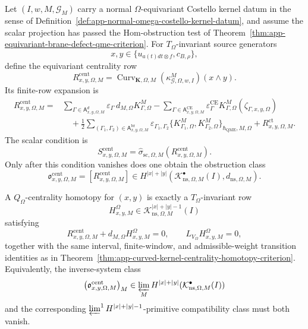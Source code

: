 \begin{prop}
\label{prop:app-qomega-centrality-homotopy-criterion}
  Let
  \((I,w,M,\mathcal G_M)\) carry a normal \(\Omega\)-equivariant
  Costello kernel datum in the sense of
  Definition~\ref{def:app-normal-omega-costello-kernel-datum}, and assume
  the scalar projection has passed the Hom-obstruction test of
  Theorem~\ref{thm:app-equivariant-brane-defect-qme-criterion}.  For
  \(T_\Omega\)-invariant source generators
  \[
    x,y\in\{u_{a(t)dt\otimes f},c_{B,\rho}\},
  \]
  define the equivariant centrality row
  \[
    R^{\mathrm{cent}}_{x,y,\Omega,M}
      =
    \operatorname{Curv}_{\mathbf K,\Omega,M}
      (\kappa^M_{\mathcal G,\Omega,w,I})(x\wedge y).
  \]
  Its finite-row expansion is
  \[
  \begin{aligned}
    R^{\mathrm{cent}}_{x,y,\Omega,M}
      ={}&
      \sum_{\Gamma\in\mathsf A_{x,y,\Omega,M}^{d}}
        \varepsilon_\Gamma\,d_{M,\Omega}K^M_{\Gamma,\Omega}
      -\sum_{\Gamma\in\mathsf A_{x,y,\Omega,M}^{\mathrm{CE}}}
        \varepsilon^{\mathrm{CE}}_\Gamma
        K^M_{\Gamma,\Omega}(\zeta_{\Gamma,x,y,\Omega})  \\
      &\quad
      +\frac12
      \sum_{(\Gamma_1,\Gamma_2)\in
        \mathsf A_{x,y,\Omega,M}^{\mathrm{br}}}
        \varepsilon_{\Gamma_1,\Gamma_2}
        \{K^M_{\Gamma_1,\Omega},
          K^M_{\Gamma_2,\Omega}\}_{\hbar_{\mathrm{QME}},M,\Omega}
      +R^{\mathrm{ct}}_{x,y,\Omega,M}.
  \end{aligned}
  \]
  The scalar condition is
  \[
    S^{\mathrm{cent}}_{x,y,\Omega,M}
      =
    \widehat\sigma_{\mathrm{sc},\Omega,M}
      (R^{\mathrm{cent}}_{x,y,\Omega,M}).
  \]
  Only after this condition vanishes does one obtain the obstruction class
  \[
    \mathfrak o^{\mathrm{cent}}_{x,y,\Omega,M}
      =
    [R^{\mathrm{cent}}_{x,y,\Omega,M}]
      \in
    H^{|x|+|y|}
      (\mathcal K^\bullet_{\mathrm{ns},\Omega,M}(I),
       d_{\mathrm{ns},\Omega,M}).
  \]

  A \(Q_\Omega\)-centrality homotopy for \((x,y)\) is exactly a
  \(T_\Omega\)-invariant row
  \[
    H^\Omega_{x,y,M}
      \in
    \mathcal K^{|x|+|y|-1}_{\mathrm{ns},\Omega,M}(I)
  \]
  satisfying
  \[
    R^{\mathrm{cent}}_{x,y,\Omega,M}
      +d_{M,\Omega}H^\Omega_{x,y,M}=0,
    \qquad
    L_{V_\Omega}H^\Omega_{x,y,M}=0,
    \label{eq:app-qomega-centrality-homotopy-equation}
  \]
  together with the same interval, finite-window, and admissible-weight
  transition identities as in
  Theorem~\ref{thm:app-curved-kernel-centrality-homotopy-criterion}.
  Equivalently, the inverse-system class
  \[
    \bigl(\mathfrak o^{\mathrm{cent}}_{x,y,\Omega,M}\bigr)_M
    \in
    \varprojlim_M
    H^{|x|+|y|}
      (\mathcal K^\bullet_{\mathrm{ns},\Omega,M}(I))
  \]
  and the corresponding
  \(\varprojlim^1 H^{|x|+|y|-1}\)-primitive compatibility class must both
  vanish.


\end{prop}
